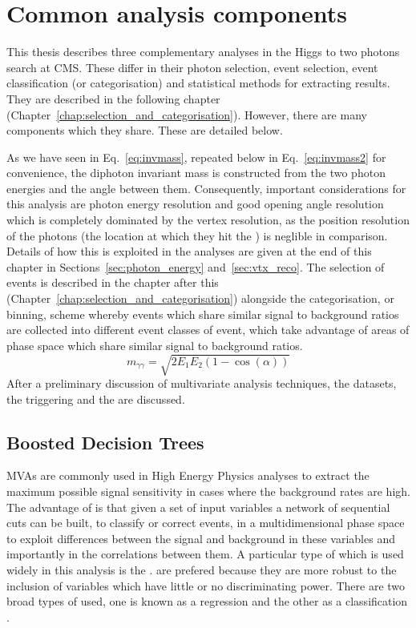 \chapter{Common analysis components}
\label{chap:common_analysis_components}

This thesis describes three complementary analyses in the Higgs to two photons search at CMS. These differ in their photon selection, event selection, event classification (or categorisation) and statistical methods for extracting results. They are described in the following chapter (Chapter~\ref{chap:selection_and_categorisation}). However, there are many components which they share. These are detailed below.

As we have seen in Eq.~\ref{eq:invmass}, repeated below in Eq.~\ref{eq:invmass2} for convenience, the diphoton invariant mass is constructed from the two photon energies and the angle between them. Consequently, important considerations for this analysis are photon energy resolution and good opening angle resolution which is completely dominated by the vertex resolution, as the position resolution of the photons (the location at which they hit the \ECAL) is neglible in comparison. Details of how this is exploited in the analyses are given at the end of this chapter in Sections~\ref{sec:photon_energy} and~\ref{sec:vtx_reco}. The selection of events is described in the chapter after this (Chapter~\ref{chap:selection_and_categorisation}) alongside the categorisation, or binning, scheme whereby events which share similar signal to background ratios are collected into different event classes of event, which take advantage of areas of phase space which share similar signal to background ratios.
\begin{equation}
  m_{\gamma\gamma} = \sqrt{2E_{1}E_{2}(1-\cos(\alpha))}
  \label{eq:invmass2}
\end{equation}
After a preliminary discussion of multivariate analysis techniques, the datasets, the triggering and the \MC are discussed.

\section{Boosted Decision Trees}
\label{sec:bdts}
\acf{MVAs} are commonly used in High Energy Physics analyses to extract the maximum possible signal sensitivity in cases where the background rates are high. The advantage of \MVAs is that given a set of input variables a network of sequential cuts can be built, to classify or correct events, in a multidimensional phase space to exploit differences between the signal and background in these variables and importantly in the correlations between them. A particular type of \MVA which is used widely in this analysis is the \BDT. \BDTs are prefered because they are more robust to the inclusion of variables which have little or no discriminating power. There are two broad types of \BDT used, one is known as a regression \BDT and the other as a classification \BDT. 

